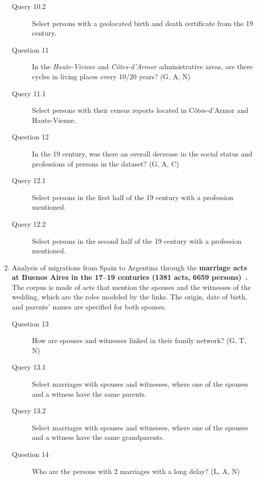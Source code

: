 \begin{enumerate}
\begin{footnotesize}
\begin{description}
    \item[\myindent Query 10.2] Select persons with a geolocated birth and death certificate from the 19 century.
    \item[Question 11] In the \textit{Haute-Vienne} and \textit{Côtes-d'Armor} administrative areas, are there cycles in living places every 10/20 years? (G, A, N)
    \item[\myindent Query 11.1] Select persons with their census reports located in Côtes-d'Armor and Haute-Vienne.
    \item[Question 12] In the 19 century, was there an overall decrease in the social status and professions of persons in the dataset? (G, A, C)
    \item[\myindent Query 12.1] Select persons in the first half of the 19 century with a profession mentioned.
    \item[\myindent Query 12.2] Select persons in the second half of the 19 century with a profession mentioned.
    \end{description}
    \end{footnotesize}
    \item Analysis of migrations from Spain to Argentina through the \textbf{marriage acts at Buenos Aires in the 17--19 centuries (1381 acts, 6659 persons)~\cite{moutoukiasBuenosAiresPort2016}.}
    The corpus is made of acts that mention the spouses and the witnesses of the wedding, which are the roles modeled by the links. The origin, date of birth, and parents' names are specified for both spouses.
    \begin{footnotesize}
    \begin{description}
    \item[Question 13] How are spouses and witnesses linked in their family network? (G, T, N)
    \item[\myindent Query 13.1] Select marriages with spouses and witnesses, where one of the spouses and a witness have the same parents.
    \item[\myindent Query 13.2] Select marriages with spouses and witnesses, where one of the spouses and a witness have the same grandparents.
    \item[Question 14] Who are the persons with 2 marriages with a long delay? (L, A, N)

\end{description}
\end{footnotesize}
\end{enumerate}
